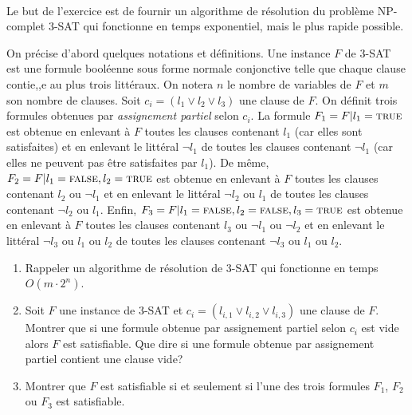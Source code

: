 \begin{td-exo}\,\\ %
	Le but de l'exercice est de fournir un algorithme de résolution du problème NP-complet \(3\)-\textsc{SAT} qui fonctionne en temps exponentiel, mais le plus rapide possible.

	On précise d'abord quelques notations et définitions.
	Une instance \(F\) de \(3\)-\textsc{SAT} est une formule booléenne sous forme normale conjonctive telle que chaque clause contie,,e au plus trois littéraux.
	On notera \(n\) le nombre de variables de \(F\) et \(m\) son nombre de clauses.
	Soit \(c_i = (l_1 \lor l_2 \lor l_3)\) une clause de \(F\).
	On définit trois formules obtenues par \emph{assignement partiel} selon \(c_i\).
	La formule \(F_1 = F | l_1 = \textsc{true}\) est obtenue en enlevant à \(F\) toutes les clauses contenant \(l_1\) (car elles sont satisfaites) et en enlevant le littéral \(\lnot l_1\) de toutes les clauses contenant \(\lnot l_1\) (car elles ne peuvent pas être satisfaites par \(l_1\)).
	De même, \(F_2 = F | l_1 = \textsc{false}, l_2 = \textsc{true}\) est obtenue en enlevant à \(F\) toutes les clauses contenant \(l_2\) ou \(\lnot l_1\) et en enlevant le littéral \(\lnot l_2\) ou \(l_1\) de toutes les clauses contenant \(\lnot l_2\) ou \(l_1\).
	Enfin, \(F_3 = F | l_1 = \textsc{false}, l_2 = \textsc{false}, l_3 = \textsc{true}\) est obtenue en enlevant à \(F\) toutes les clauses contenant \(l_3\) ou \(\lnot l_1\) ou \(\lnot l_2\) et en enlevant le littéral \(\lnot l_3\) ou \(l_1\) ou \(l_2\) de toutes les clauses contenant \(\lnot l_3\) ou \(l_1\) ou \(l_2\).

	\begin{enumerate}
		\item Rappeler un algorithme de résolution de \(3\)-\textsc{SAT} qui fonctionne en temps \(O(m \cdot 2^n)\).
		
		\item Soit \(F\) une instance de \(3\)-\textsc{SAT} et \(c_i = (l_{i,1} \lor l_{i,2} \lor l_{i,3})\) une clause de \(F\).
		Montrer que si une formule obtenue par assignement partiel selon \(c_i\) est vide alors \(F\) est satisfiable.
		Que dire si une formule obtenue par assignement partiel contient une clause vide?

		\item Montrer que \(F\) est satisfiable si et seulement si l'une des trois formules \(F_1\), \(F_2\) ou \(F_3\) est satisfiable.
	\end{enumerate}
\end{td-exo}

